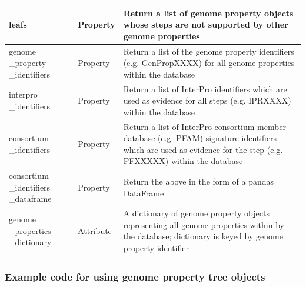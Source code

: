 \begin{longtable}{|p{2.7cm}|p{2cm}|p{10cm}|}
leafs                                       & Property      & Return a list of genome property objects whose steps are not supported by other genome properties                                                                                                                                                                               \\ \hline
genome \_property \_identifiers               & Property      & Return a list of the genome property identifiers (e.g. GenPropXXXX) for all genome properties within the database                                                                                                                                                               \\ \hline
interpro \_identifiers                       & Property      & Return a list of InterPro identifiers which are used as evidence for all steps (e.g. IPRXXXX) within the database                                                                                                                                                               \\ \hline
consortium \_identifiers                     & Property      & Return a list of InterPro consortium member database (e.g. PFAM) signature identifiers which are used as evidence for the step (e.g. PFXXXXX) within the database                                                                                                               \\ \hline
consortium \_identifiers \_dataframe          & Property      & Return the above in the form of a pandas DataFrame                                                                                                                                                                                                                              \\ \hline
genome \_properties \_dictionary              & Attribute     & A dictionary of genome property objects representing all genome properties within by the database; dictionary is keyed by genome property identifier                                                                                                                            \\ \hline
\end{longtable}

\subsubsection{Example code for using genome property tree objects}


